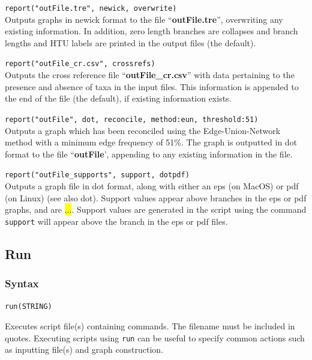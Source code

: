 	\begin{example}
	
		\item{\texttt{report("outFile.tre", newick, overwrite)}\\ Outputs graphs in newick 
		format to the file ``\textbf{outFile.tre}'', overwriting any existing information.
		In addition, zero length branches are collapses and branch lengths and HTU 
		labels are printed in the output files (the default).}
		
		\item{\texttt{report("outFile\_cr.csv", crossrefs)}\\ Outputs the cross reference file 
		``\textbf{outFile\_cr.csv}'' with data pertaining to the presence and absence of 
		taxa in the input files. This information is appended to the end of the file (the 
		default), if existing information exists.}
		
		\item{\texttt{report("outFile", dot, reconcile, method:eun, threshold:51)}\\ Outputs a
		graph which has been reconciled using the Edge-Union-Network method with a 
		minimum edge frequency of 51\%. The graph is outputted in dot format to the 
		file ``\textbf{outFile}', appending to any existing information in the file.}
		
		\item{\texttt{report("outFile\_supports", support, dotpdf)}\\ Outputs a graph file in 
		dot format, along with either an eps (on MacOS) or pdf (on Linux) (see also dot). 
		Support values appear above branches in the eps or pdf graphs, and are \hl{...}.
		Support values are generated in the script using the command \texttt{support}
		will appear above the branch in the eps or pdf files.}
		
	\end{example}
		
\subsection{Run}
	\subsubsection{Syntax}
		\texttt{run(STRING)}
		
	\begin{phygdescription}
		{Executes \phyg script file(s) containing commands. The filename must be 
		included in quotes. Executing scripts using \texttt{run} can be useful to specify 
		common actions such as inputting file(s) and graph construction.}
	\end{phygdescription}
	
